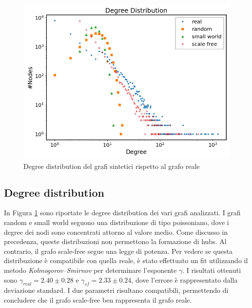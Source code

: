 \documentclass[sigchi]{acmart}
\begin{document}
\begin{figure}[h]
    \centering
    \includegraphics[width=\linewidth]{img/Degree_Distribution.png}
    \caption{Degree distribution del grafi sintetici rispetto al grafo reale} \label{fig:degree_dist}
\end{figure}

\subsection{Degree distribution}
In Figura \ref{fig:degree_dist} sono riportate le degree distribution dei vari grafi analizzati. I grafi random e small world seguono una distribuzione di tipo poissoniano, dove i degree dei nodi sono concentrati attorno al valore medio. Come discusso in precedenza, queste distribuzioni non permettono la formazione di hubs. Al contrario, il grafo scale-free segue una legge di potenza. Per vedere se questa distribuzione è compatibile con quella reale, è stato effettuato un fit utilizzando il metodo \textit{Kolmogorov–Smirnov} \cite{kolmogorov1933sulla}\cite{smirnov1948table} per determinare l'esponente $\gamma$. I risultati ottenuti sono $\gamma_{real} = 2.40 \pm 0.28$ e $\gamma_{sf} = 2.33 \pm 0.24$, dove l'errore è rappresentato dalla deviazione standard. I due parametri risultano compatibili, permettendo di concludere che il grafo scale-free ben rappresenta il grafo reale.
\end{document}
